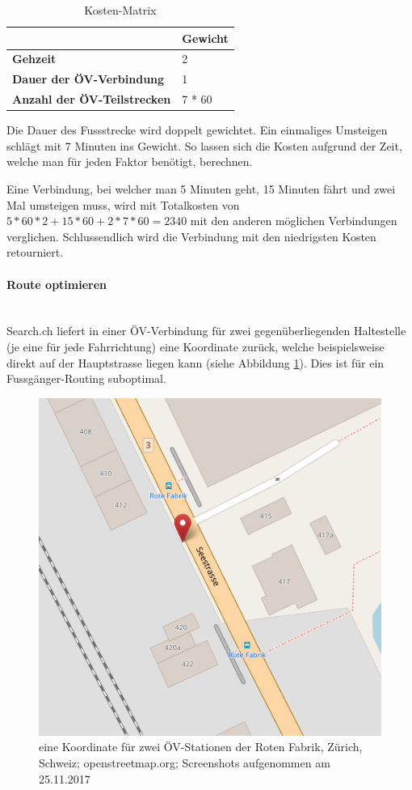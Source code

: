 \begin{table}[ht]
    \centering
    \begin{tabular}{l|l}
        & \textbf{Gewicht} \\ \hline
        \textbf{Gehzeit}                    & 2                \\
        \textbf{Dauer der ÖV-Verbindung}    & 1                \\
        \textbf{Anzahl der ÖV-Teilstrecken} & 7 * 60          
    \end{tabular}
    \caption{Kosten-Matrix}
    \label{table:cost-matrix}
\end{table}

Die Dauer des Fussstrecke wird doppelt gewichtet. Ein einmaliges Umsteigen schlägt mit 7 Minuten ins Gewicht. So lassen sich die Kosten aufgrund der Zeit, welche man für jeden Faktor benötigt, berechnen.

Eine Verbindung, bei welcher man 5 Minuten geht, 15 Minuten fährt und zwei Mal umsteigen muss, wird mit Totalkosten von $5 * 60 * 2 + 15 * 60 + 2 * 7 * 60 = 2340$ mit den anderen möglichen Verbindungen verglichen. Schlussendlich wird die Verbindung mit den niedrigsten Kosten retourniert.

\paragraph{Route optimieren}\label{impl:Plaza Routing Route optimieren}~\\
Search.ch \cite{search_ch_route_api} liefert in einer ÖV-Verbindung für zwei gegenüberliegenden Haltestelle (je eine für jede Fahrrichtung) eine Koordinate zurück, welche beispielsweise direkt auf der Hauptstrasse liegen kann (siehe Abbildung \ref{fig:one_coordinate_for_two_stops}). Dies ist für ein Fussgänger-Routing suboptimal.

\begin{figure}[ht]
\centering
\includegraphics[width=0.5\linewidth]{projectdoc/img/one_coordinate_for_two_stops}
\caption[eine Koordinate für zwei ÖV-Stationen]{eine Koordinate für zwei ÖV-Stationen der Roten Fabrik, Zürich, Schweiz; openstreetmap.org; Screenshots aufgenommen am 25.11.2017}
\label{fig:one_coordinate_for_two_stops}
\end{figure}

